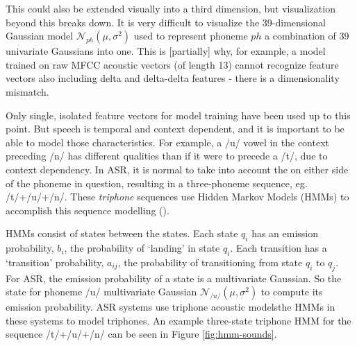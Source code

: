 \DIFdelend This could also be extended visually into a third dimension, but visualization beyond this breaks down.  It is very difficult to visualize the 39-dimensional Gaussian model $\mathcal{N}_{ph}(\mu,\sigma^2)$ \DIFdelbegin {}\DIFdelend \DIFaddbegin {}\DIFaddend used to represent \DIFaddbegin {}\DIFaddend phoneme $ph$ \DIFdelbegin {}\DIFdelend \DIFaddbegin {}\DIFaddend a combination of 39 univariate Gaussians into one.
This is [partially] why, for example, a model trained on raw MFCC acoustic vectors (of length 13) cannot recognize feature vectors also including delta and delta-delta features \DIFaddbegin {}\DIFaddend - there is a dimensionality mismatch.

Only single, isolated feature vectors for model training have been used up to this point.  But speech is temporal and context dependent, and it is important to be able to model those characteristics.  For example, a /u/ vowel in the context preceding \DIFdelbegin {}\DIFdelend \DIFaddbegin {}\DIFaddend /n/ has different qualities than if it were to precede a /t/, due to context dependency.  In ASR, it is normal to take into account the \DIFdelbegin {}\DIFdelend \DIFaddbegin {}\DIFaddend on either side of the phoneme in question, resulting in a three-phoneme sequence, eg. /t/+/u/+/n/.  These \textit{triphone} sequences use Hidden Markov Models (HMMs) to accomplish this sequence modelling (\cite{jurafsky:09}).

HMMs consist of states \DIFdelbegin {}\DIFdelend \DIFaddbegin {}\DIFaddend between the states.  Each state $q_i$ has an emission probability, $b_i$, \DIFaddbegin {}\DIFaddend the probability of `landing' in state $q_i$. %
Each transition has a `transition' probability, $a_{ij}$, \DIFdelbegin {}\DIFdelend \DIFaddbegin {}\DIFaddend the probability of transitioning from state $q_i$ to $q_j$.  For ASR, the emission probability of a state is a multivariate Gaussian.  So the state for phoneme /u/ \DIFdelbegin {}\DIFdelend \DIFaddbegin {}\DIFaddend multivariate Gaussian $\mathcal{N}_{/u/}(\mu,\sigma^2)$ \DIFaddbegin {}\DIFaddend to compute its emission probability.  \DIFdelbegin {}\DIFdelend \DIFaddbegin {}\DIFaddend ASR systems use triphone acoustic models\DIFdelbegin \DIFdel{, }\DIFdelend \DIFaddbegin \DIFadd{; }\DIFaddend the HMMs in these systems \DIFdelbegin {}\DIFdelend \DIFaddbegin {}\DIFaddend to model triphones.  An example three-state triphone HMM for the sequence /t/+/u/+/n/ can be seen in Figure \ref{fig:hmm-sounds}.  

